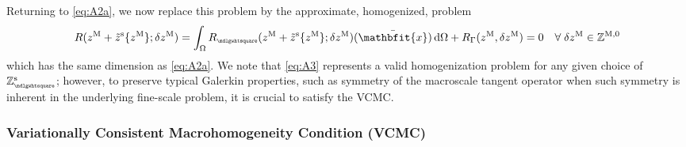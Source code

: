 \documentclass[12pt,a4paper]{article}
\renewcommand{\ta}[1]{\mathbfit{#1}}
\renewcommand{\Box}{\mdlgwhtsquare}
\newcommand{\rve}{
  {\mathchoice
   {\mbox{\scalebox{0.67}{$\Box$}}}
   {\mbox{\scalebox{0.67}{$\Box$}}}
   {\mbox{\scalebox{0.5}{$\Box$}}}
   {\mbox{\scalebox{0.375}{$\Box$}}}
  }
}
\begin{document}
Returning to \eqref{eq:A2a}, we now replace this problem by the approximate, homogenized, problem
\begin{align}
\label{eq:A3} R(z^\macro+\tilde{z}^\fluct\{z^\macro\};\delta z^\macro) = \int_\Omega R_\rve(z^\macro+\tilde{z}^\fluct\{z^\macro\};\delta z^\macro)(\bar{\ta x})\dif\Omega
 + R_\Gamma(z^\macro, \delta z^\macro) = 0 \quad \forall\;\delta z^\macro \in \set Z^{\macro,0}
\end{align}
which has the same dimension as \eqref{eq:A2a}.
We note that \eqref{eq:A3} represents a valid homogenization problem for any given choice of $\set{Z}_\rve^{\fluct}$; however, to preserve typical Galerkin properties, such as symmetry of the macroscale tangent operator when such symmetry is inherent in the underlying fine-scale problem, it is crucial to satisfy the VCMC.

\subsubsection{Variationally Consistent Macrohomogeneity Condition (VCMC)}
\end{document}

